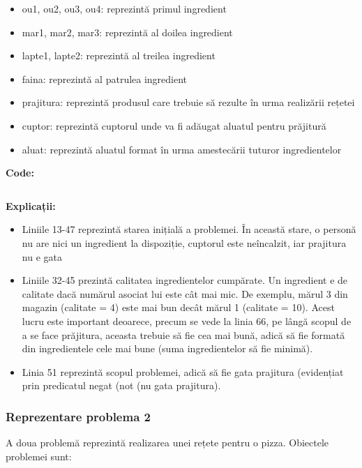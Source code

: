  \begin{itemize}
    \setlength\itemsep{0em}
    \item ou1, ou2, ou3, ou4: reprezintă primul ingredient
    \item mar1, mar2, mar3: reprezintă al doilea ingredient
    \item lapte1, lapte2: reprezintă al treilea ingredient
    \item faina: reprezintă al patrulea ingredient
    \item prajitura: reprezintă produsul care trebuie să rezulte în urma realizării rețetei
    \item cuptor: reprezintă cuptorul unde va fi adăugat aluatul pentru prăjitură
    \item aluat: reprezintă aluatul format în urma amestecării tuturor ingredientelor


\end{itemize}
\textbf{Code:}

    \inputminted[linenos]{C}{cod/problem_reteta_heuristics.pddl}
    
 \textbf{ Explicații:}

  \begin{itemize}
    \setlength\itemsep{0em}
    \item Liniile 13-47 reprezintă starea inițială a problemei. În această stare, o personă nu are nici un ingredient la dispoziție, cuptorul este neîncalzit, iar prajitura nu e gata
    \item Liniile 32-45 prezintă calitatea ingredientelor cumpărate. Un ingredient e de calitate dacă numărul asociat lui este cât
  mai mic. De exemplu, mărul 3 din magazin (calitate = 4) este mai bun decât mărul 1 (calitate = 10). Acest lucru este 
  important deoarece, precum se vede la linia 66, pe lângă scopul de a se face prăjitura, aceasta trebuie să fie
  cea mai bună, adică să fie formată din ingredientele cele mai bune (suma ingredientelor să fie minimă).  
  \item Linia 51 reprezintă scopul problemei, adică să fie gata prajitura (evidențiat prin predicatul negat (not (nu gata 
  prajitura).

  
\end{itemize}   

\newpage

\subsubsection{Reprezentare problema 2}
A doua  problemă reprezintă realizarea unei rețete pentru o pizza.
Obiectele problemei sunt:

